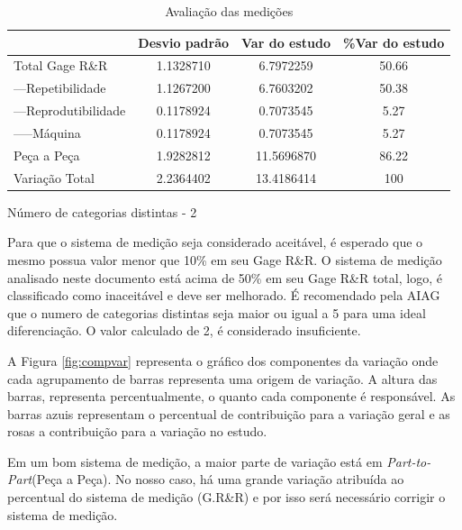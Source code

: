 \documentclass[
12pt,					%
openright,				%
oneside,				%
a4paper,				%
english,
brazil
]{ABNT/abntex2_report}
\begin{document}
\begin{table}[H]
	\caption{Avaliação das medições}
	\centering
	\begin{tabular}{lccc}
										   & \multicolumn{1}{l}{Desvio padrão} & \multicolumn{1}{l}{Var do estudo} & \multicolumn{1}{l}{\%Var do estudo} \\ \hline
	\multicolumn{1}{l|}{Total Gage R\&R}   & 1.1328710                  & 6.7972259                    & 50.66                          \\
	\multicolumn{1}{l|}{---Repetibilidade}    & 1.1267200                  & 6.7603202                    & 50.38                          \\
	\multicolumn{1}{l|}{---Reprodutibilidade} & 0.1178924                  & 0.7073545                    & 5.27                           \\
	\multicolumn{1}{l|}{-----Máquina}           & 0.1178924                  & 0.7073545                    & 5.27                           \\
	\multicolumn{1}{l|}{Peça a Peça}       & 1.9282812                  & 11.5696870                   & 86.22                          \\
	\multicolumn{1}{l|}{Variação Total}    & 2.2364402                  & 13.4186414                   & 100                           
	\end{tabular}
	\label{tab:avamed}
\end{table}	

Número de categorias distintas - 2

Para que o sistema de medição seja considerado aceitável, é esperado que o mesmo possua valor menor que 10\% em seu Gage R\&R. O sistema de medição analisado neste documento está acima de 50\% em seu Gage R\&R total, logo, é classificado como inaceitável e deve ser melhorado. É recomendado pela AIAG que o numero de categorias distintas seja maior ou igual a 5 para uma ideal diferenciação. O valor calculado de 2, é considerado insuficiente. 

A Figura \ref{fig:compvar} representa o gráfico dos componentes da variação onde cada agrupamento de barras representa uma origem de
variação. A altura das barras, representa percentualmente, o quanto cada componente é responsável. As barras azuis representam o percentual de contribuição para a variação geral e as rosas a contribuição para a variação no estudo.

Em um bom sistema de medição, a maior parte de variação está em \textit{Part-to-Part}(Peça a Peça). No nosso caso, há uma grande variação atribuída ao percentual do sistema de medição (G.R\&R) e por isso será necessário corrigir o sistema de medição.
\end{document}
